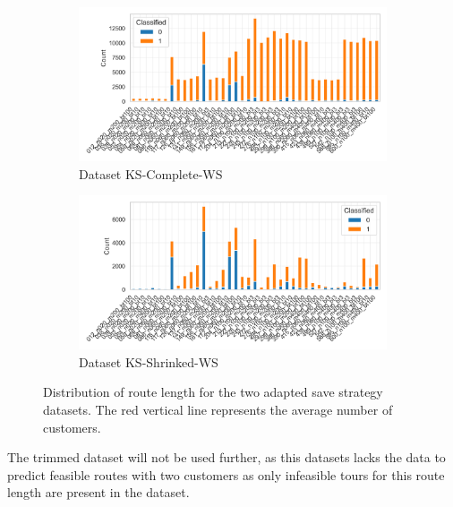 \begin{figure}[ht]
    \centering
    \begin{subfigure}[t]{.5\textwidth}
        \centering
        \includegraphics[width=\linewidth]{pictures/dataset_structure/distribution_plot_krebs_28880_600_WS.png}
        \caption{Dataset KS-Complete-WS}
        \label{fig:ds-a-krebs_x}
    \end{subfigure}%
    \begin{subfigure}[t]{.5\textwidth}
        \centering
        \includegraphics[width=\linewidth]{pictures/dataset_structure/distribution_plot_krebs_28880_600_WS_shrinked094.png}
        \caption{Dataset KS-Shrinked-WS}
        \label{fig:ds-b-krebs_l}
    \end{subfigure}
    \caption{Distribution of route length for the two adapted save strategy datasets. The red vertical line represents the average
        number of customers.}
    \label{fig:route-feasibility_save_krebs}
\end{figure}

The trimmed dataset will not be used further, as this datasets lacks the data to predict feasible routes with two customers as only
infeasible tours for this route length are present in the dataset.

